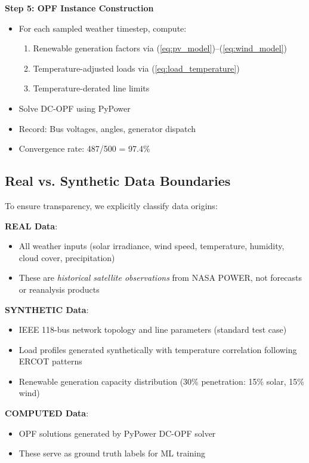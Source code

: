 \documentclass[journal,12pt,onecolumn]{IEEEtran}
\begin{document}
\textbf{Step 5: OPF Instance Construction}
\begin{itemize}
    \item For each sampled weather timestep, compute:
    \begin{enumerate}
        \item Renewable generation factors via (\ref{eq:pv_model})--(\ref{eq:wind_model})
        \item Temperature-adjusted loads via (\ref{eq:load_temperature})
        \item Temperature-derated line limits
    \end{enumerate}
    \item Solve DC-OPF using PyPower \cite{ref24}
    \item Record: Bus voltages, angles, generator dispatch
    \item Convergence rate: 487/500 = 97.4\%
\end{itemize}

\subsection{Real vs. Synthetic Data Boundaries}

To ensure transparency, we explicitly classify data origins:

\textbf{REAL Data}:
\begin{itemize}
    \item All weather inputs (solar irradiance, wind speed, temperature, humidity, cloud cover, precipitation)
    \item These are \textit{historical satellite observations} from NASA POWER, not forecasts or reanalysis products
\end{itemize}

\textbf{SYNTHETIC Data}:
\begin{itemize}
    \item IEEE 118-bus network topology and line parameters (standard test case)
    \item Load profiles generated synthetically with temperature correlation following ERCOT patterns \cite{ref32}
    \item Renewable generation capacity distribution (30\% penetration: 15\% solar, 15\% wind)
\end{itemize}

\textbf{COMPUTED Data}:
\begin{itemize}
    \item OPF solutions generated by PyPower DC-OPF solver
    \item These serve as ground truth labels for ML training
\end{itemize}
\end{document}
